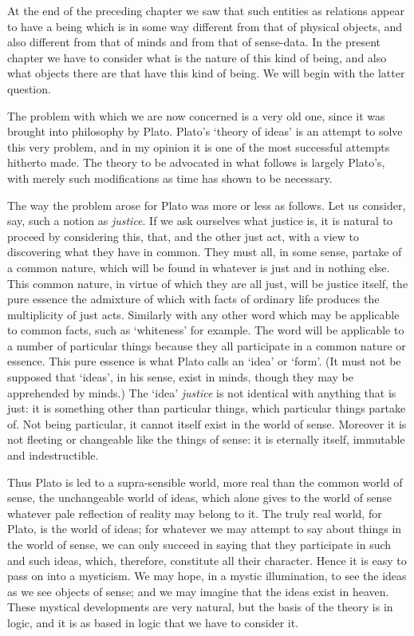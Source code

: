 \documentclass[oneside,letterpaper,12pt]{book}
\begin{document}
At the end of the preceding chapter we saw that such entities as
relations appear to have a being which is in some way different from
that of physical objects, and also different from that of minds and from
that of sense-data. In the present chapter we have to consider what is
the nature of this kind of being, and also what objects there are that
have this kind of being. We will begin with the latter question.

The problem with which we are now concerned is a very old one, since it
was brought into philosophy by Plato. Plato's
`theory of ideas' is an attempt to
solve this very problem, and in my opinion it is one of the most
successful attempts hitherto made. The theory to be advocated in what
follows is largely Plato's, with merely such
modifications as time has shown to be necessary.

The way the problem arose for Plato was more or less as follows. Let us
consider, say, such a notion as \emph{justice}. \label{tokens} If we ask ourselves what
justice is, it is natural to proceed by considering this, that, and the
other just act, with a view to discovering what they have in common.
They must all, in some sense, partake of a common nature, which will be
found in whatever is just and in nothing else. This common nature, in
virtue of which they are all just, will be justice itself, the pure
essence the admixture of which with facts of ordinary life produces the
multiplicity of just acts. Similarly with any other word which may be
applicable to common facts, such as
`whiteness' for example. The word will
be applicable to a number of particular things because they all
participate in a common nature or essence. \label{types} This pure essence is what
Plato calls an `idea' or
`form'. (It must not be supposed that
`ideas', in his sense, exist in minds,
though they may be apprehended by minds.) The
`idea' \emph{justice} is not identical
with anything that is just: it is something other than particular
things, which particular things partake of. Not being particular, it
cannot itself exist in the world of sense. Moreover it is not fleeting
or changeable like the things of sense: it is eternally itself,
immutable and indestructible.

Thus Plato is led to a supra-sensible world, more real than the common
world of sense, the unchangeable world of ideas, which alone gives to
the world of sense whatever pale reflection of reality may belong to it.
The truly real world, for Plato, is the world of ideas; for whatever we
may attempt to say about things in the world of sense, we can only
succeed in saying that they participate in such and such ideas, which,
therefore, constitute all their character. Hence it is easy to pass on
into a mysticism. We may hope, in a mystic illumination, to see the
ideas as we see objects of sense; and we may imagine that the ideas
exist in heaven. These mystical developments are very natural, but the
basis of the theory is in logic, and it is as based in logic that we
have to consider it.
\end{document}
